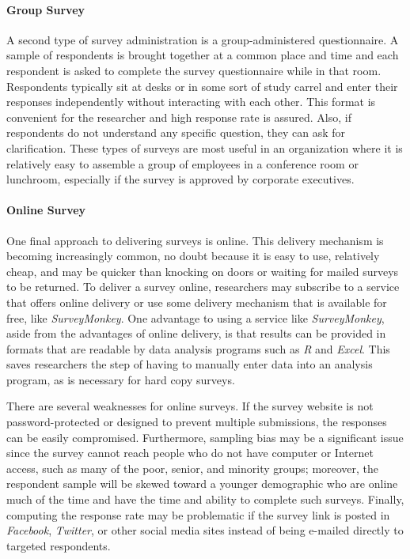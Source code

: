 \paragraph{Group Survey}

A second type of survey administration is a group-administered questionnaire. A sample of respondents is brought together at a common place and time and each respondent is asked to complete the survey questionnaire while in that room. Respondents typically sit at desks or in some sort of study carrel and enter their responses independently without interacting with each other. This format is convenient for the researcher and high response rate is assured. Also, if respondents do not understand any specific question, they can ask for clarification. These types of surveys are most useful in an organization where it is relatively easy to assemble a group of employees in a conference room or lunchroom, especially if the survey is approved by corporate executives.

\paragraph{Online Survey}

One final approach to delivering surveys is online. This delivery mechanism is becoming increasingly common, no doubt because it is easy to use, relatively cheap, and may be quicker than knocking on doors or waiting for mailed surveys to be returned. To deliver a survey online, researchers may subscribe to a service that offers online delivery or use some delivery mechanism that is available for free, like \textit{SurveyMonkey}. One advantage to using a service like \textit{SurveyMonkey}, aside from the advantages of online delivery, is that results can be provided in formats that are readable by data analysis programs such as \textit{R} and \textit{Excel}. This saves researchers the step of having to manually enter data into an analysis program, as is necessary for hard copy surveys.

There are several weaknesses for online surveys. If the survey website is not password-protected or designed to prevent multiple submissions, the responses can be easily compromised. Furthermore, sampling bias may be a significant issue since the survey cannot reach people who do not have computer or Internet access, such as many of the poor, senior, and minority groups; moreover, the respondent sample will be skewed toward a younger demographic who are online much of the time and have the time and ability to complete such surveys. Finally, computing the response rate may be problematic if the survey link is posted in \textit{Facebook}, \textit{Twitter}, or other social media sites instead of being e-mailed directly to targeted respondents. 

